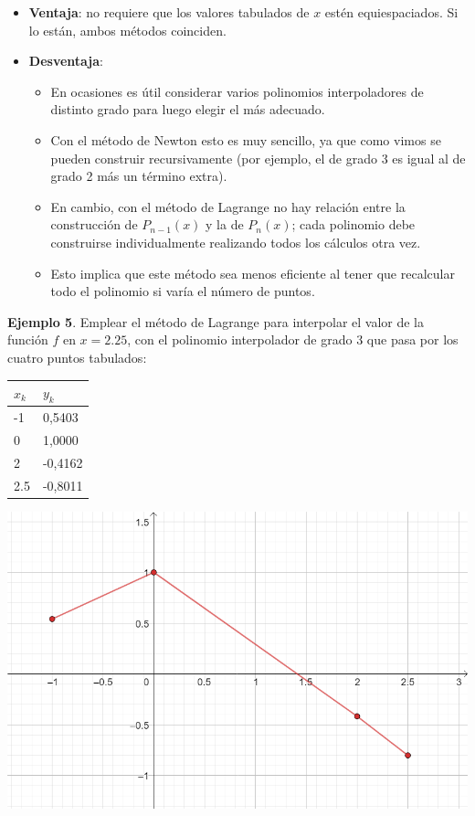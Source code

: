 \documentclass[]{book}
\providecommand{\tightlist}{%
  \setlength{\itemsep}{0pt}\setlength{\parskip}{0pt}}
\begin{document}
\begin{itemize}
\item
  \textbf{Ventaja}: no requiere que los valores tabulados de \(x\) estén equiespaciados. Si lo están, ambos métodos coinciden.
\item
  \textbf{Desventaja}:

  \begin{itemize}
  \tightlist
  \item
    En ocasiones es útil considerar varios polinomios interpoladores de distinto grado para luego elegir el más adecuado.
  \item
    Con el método de Newton esto es muy sencillo, ya que como vimos se pueden construir recursivamente (por ejemplo, el de grado 3 es igual al de grado 2 más un término extra).
  \item
    En cambio, con el método de Lagrange no hay relación entre la construcción de \(P_{n-1}(x)\) y la de \(P_n(x)\); cada polinomio debe construirse individualmente realizando todos los cálculos otra vez.
  \item
    Esto implica que este método sea menos eficiente al tener que recalcular todo el polinomio si varía el número de puntos.
  \end{itemize}
\end{itemize}

\textbf{Ejemplo 5}. Emplear el método de Lagrange para interpolar el valor de la función \(f\) en \(x=2.25\), con el polinomio interpolador de grado 3 que pasa por los cuatro puntos tabulados:

\begin{longtable}[]{@{}ll@{}}
\toprule
\(x_k\) & \(y_k\)\tabularnewline
\midrule
\endhead
-1 & 0,5403\tabularnewline
0 & 1,0000\tabularnewline
2 & -0,4162\tabularnewline
2.5 & -0,8011\tabularnewline
\bottomrule
\end{longtable}

\begin{center}\includegraphics[width=1\linewidth]{Plots/U4/lagrej1} \end{center}
\end{document}
